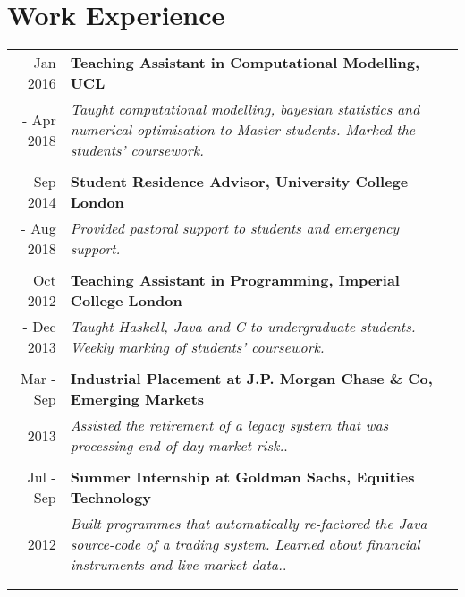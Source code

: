 \documentclass[a4paper,10pt]{article} %
\begin{document}
\section*{Work Experience}

\begin{tabular}{r|p{15cm}}
Jan 2016 & \large\textbf{Teaching Assistant in Computational Modelling, UCL} \\
- Apr 2018 & \emph{Taught computational modelling, bayesian statistics and numerical optimisation to Master students. Marked the students' coursework.}\\
\multicolumn{2}{c}{} \\



Sep 2014 & \large\textbf{Student Residence Advisor, University College London} \\
- Aug 2018 & \emph{Provided pastoral support to students and emergency support.}\\ 
\multicolumn{2}{c}{} \\



Oct 2012 & \large\textbf{Teaching Assistant in Programming, Imperial College London} \\
- Dec 2013 & \emph{Taught Haskell, Java and C to undergraduate students. Weekly marking of students' coursework.}\\
\multicolumn{2}{c}{} \\


Mar - Sep & \large\textbf{Industrial Placement at J.P. Morgan Chase \& Co, Emerging
Markets}\\
2013 & \emph{Assisted the retirement of a legacy system that was processing end-of-day market risk.}.\\
\multicolumn{2}{c}{} \\

Jul - Sep & \large\textbf{Summer Internship at Goldman Sachs, Equities Technology}\\
2012 & \emph{Built programmes that automatically re-factored the Java source-code of a trading system. Learned about financial instruments and live market data.}.\\
\multicolumn{2}{c}{} \\


\multicolumn{2}{c}{} \\
\end{tabular}
\vspace{-3em}
\end{document}
